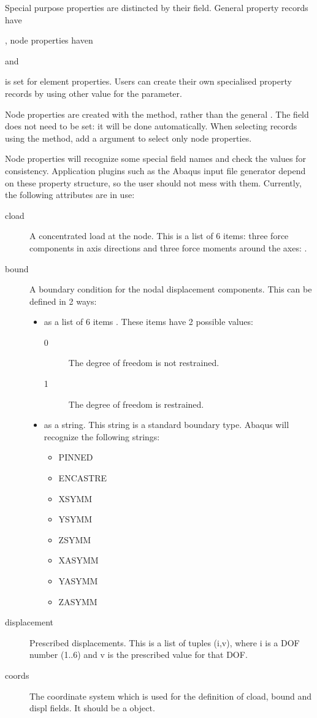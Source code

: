 Special purpose properties are distincted by their  field. General property records have {, node properties haven { and 
 { is set for element properties. Users can create their own specialised property records by using other value for the  parameter.

Node properties are created with the  method, rather than the general . The  field does not need to be set: it will be done automatically. When selecting records using the  method, add a  argument to select only node properties.

Node properties will recognize some special field names and check the values for consistency. Application plugins such as the Abaqus input file generator depend on these property structure, so the user should not mess with them. Currently, the following attributes are in use:
\begin{description}
 \item [cload] A concentrated load at the node. This is a list of 6 items: three force components in axis directions and three force moments around the axes: \Code{[F_0, F_1, F_2, M_0, M_1, M_2]}. 
 \item [bound] A boundary condition for the nodal displacement components. This can be defined in 2 ways:
     \begin{itemize}
     \item as a list of 6 items \Code{[ u_0, u_1, u_2, r_0, r_1, r_2 ]}. These items have 2 possible values:
         \begin{description}
         \item [0] The degree of freedom is not restrained.
         \item [1] The degree of freedom is restrained.
         \end{description}
     \item as a string. This string is a standard boundary type. Abaqus will recognize the following strings:
         \begin{itemize}
         \item PINNED 
         \item ENCASTRE
         \item XSYMM
         \item YSYMM
         \item ZSYMM
         \item XASYMM
         \item YASYMM 
         \item ZASYMM
         \end{itemize} 
     \end{itemize}
 \item [displacement] Prescribed displacements. This is a list of tuples (i,v), where i is a DOF number (1..6) and v is the prescribed value for that DOF. 
 \item [coords] The coordinate system which is used for the definition of cload, bound and displ fields. It should be a  object.
\end{description}

}}}
